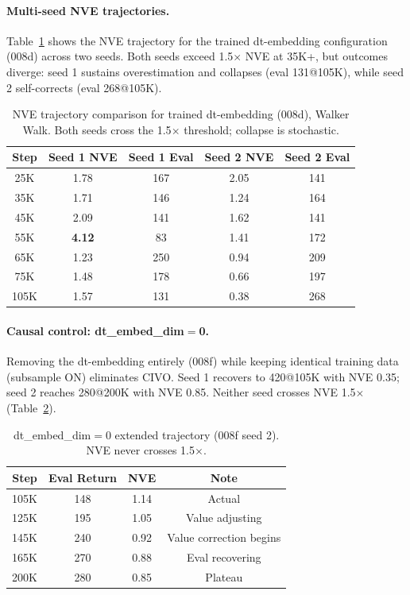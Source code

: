 \documentclass[10pt,letterpaper]{article}
\begin{document}
\paragraph{Multi-seed NVE trajectories.}
Table~\ref{tab:nve_seeds} shows the NVE trajectory for the trained dt-embedding configuration (008d) across two seeds.
Both seeds exceed 1.5$\times$ NVE at 35K+, but outcomes diverge: seed 1 sustains overestimation and collapses (eval 131@105K), while seed 2 self-corrects (eval 268@105K).

\begin{table}[h]
\centering
\caption{NVE trajectory comparison for trained dt-embedding (008d), Walker Walk. Both seeds cross the 1.5$\times$ threshold; collapse is stochastic.}
\label{tab:nve_seeds}
\begin{tabular}{ccccc}
\toprule
\textbf{Step} & \textbf{Seed 1 NVE} & \textbf{Seed 1 Eval} & \textbf{Seed 2 NVE} & \textbf{Seed 2 Eval} \\
\midrule
25K & 1.78 & 167 & 2.05 & 141 \\
35K & 1.71 & 146 & 1.24 & 164 \\
45K & 2.09 & 141 & 1.62 & 141 \\
55K & \textbf{4.12} & 83 & 1.41 & 172 \\
65K & 1.23 & 250 & 0.94 & 209 \\
75K & 1.48 & 178 & 0.66 & 197 \\
105K & 1.57 & 131 & 0.38 & 268 \\
\bottomrule
\end{tabular}
\end{table}

\paragraph{Causal control: dt\_embed\_dim$=$0.}
Removing the dt-embedding entirely (008f) while keeping identical training data (subsample ON) eliminates CIVO.
Seed 1 recovers to 420@105K with NVE 0.35; seed 2 reaches 280@200K with NVE 0.85.
Neither seed crosses NVE 1.5$\times$ (Table~\ref{tab:008f}).

\begin{table}[h]
\centering
\caption{dt\_embed\_dim$=$0 extended trajectory (008f seed 2). NVE never crosses 1.5$\times$.}
\label{tab:008f}
\begin{tabular}{cccc}
\toprule
\textbf{Step} & \textbf{Eval Return} & \textbf{NVE} & \textbf{Note} \\
\midrule
105K & 148 & 1.14 & Actual \\
125K & 195 & 1.05 & Value adjusting \\
145K & 240 & 0.92 & Value correction begins \\
165K & 270 & 0.88 & Eval recovering \\
200K & 280 & 0.85 & Plateau \\
\bottomrule
\end{tabular}
\end{table}
\end{document}

